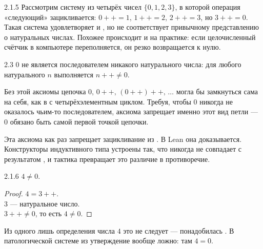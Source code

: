 \begin{example}{2.1.5}{}
Рассмотрим систему из четырёх чисел $\{0,1,2,3\}$, в которой операция «следующий»
зацикливается: $0{+}{+}=1$, $1{+}{+}=2$, $2{+}{+}=3$, но $3{+}{+}=0$. Такая система
удовлетворяет  и , но не
соответствует привычному представлению о натуральных числах. Похожее происходит и на
практике: если целочисленный счётчик в компьютере переполняется, он резко возвращается
к нулю.
\end{example}

\begin{axiom}{2.3}{}
$0$ не является последователем никакого натурального числа: для любого натурального
$n$ выполняется $n{+}{+} \neq 0$.
\end{axiom}

\begin{intuition}
Без этой аксиомы цепочка $0,\,0{+}{+},\,(0{+}{+}){+}{+},\,\ldots$ могла бы замкнуться сама
на себя, как в  с четырёхэлементным циклом. Требуя, чтобы
$0$ никогда не оказалось чьим-то последователем, аксиома запрещает именно этот вид петли —
$0$ обязано быть самой первой точкой цепочки.
\end{intuition}

\begin{remark}
Эта аксиома как раз запрещает зацикливание из .
В Lean она доказывается. Конструкторы индуктивного типа устроены так, что 
никогда не совпадает с результатом , и тактика  превращает это
различие в противоречие.
\end{remark}

\begin{proposition}{2.1.6}{}
$4 \neq 0$.
\end{proposition}

\begin{proof}
$4 = 3{+}{+}$.\\
$3$ — натуральное число.\\
$3{+}{+} \neq 0$, то есть $4 \neq 0$.
\end{proof}

\begin{remark}
Из одного лишь определения числа $4$ это не следует — понадобилась
. В патологической системе из
 утверждение вообще ложно: там $4 = 0$.
\end{remark}

